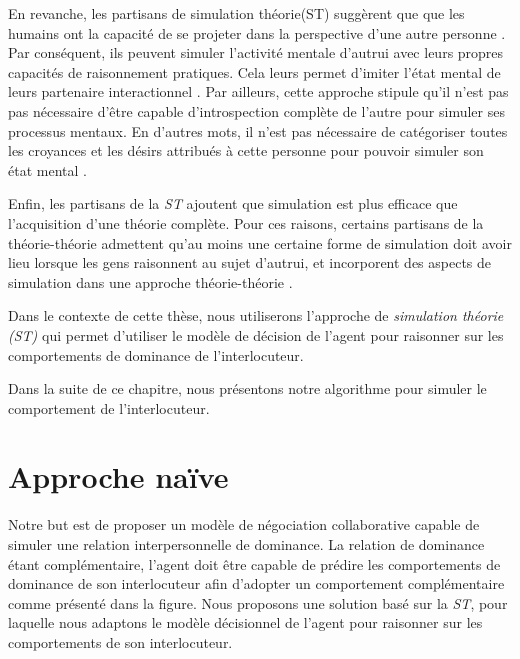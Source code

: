 En revanche, les partisans de simulation théorie(ST)  suggèrent que  que les humains ont la capacité de se projeter dans la perspective d'une autre personne \cite{shanton2010simulation}.
Par conséquent, ils peuvent simuler l'activité mentale d'autrui avec leurs propres capacités de raisonnement pratiques. Cela leurs permet d'imiter l'état mental de leurs partenaire interactionnel \cite{harbers2009modeling}.
Par ailleurs, cette approche stipule qu'il n'est pas pas nécessaire d'être capable d'introspection complète de l'autre pour simuler ses processus mentaux. En d'autres mots, il n'est pas nécessaire de catégoriser toutes les croyances et les désirs attribués à cette personne pour pouvoir simuler son état mental \cite{harbers2012modeling}.

Enfin, les partisans de la \emph{ST} ajoutent que simulation est plus efficace que l'acquisition d'une théorie complète. Pour ces raisons, certains partisans de la théorie-théorie admettent qu'au moins une certaine forme de simulation doit avoir lieu lorsque les gens raisonnent au sujet d'autrui, et incorporent des aspects de simulation dans une approche théorie-théorie \cite{harbers2012modeling}.

Dans le contexte de cette thèse, nous utiliserons l'approche de \emph{simulation théorie (ST)} qui permet d'utiliser le modèle de décision de l'agent pour raisonner sur les comportements de dominance de l'interlocuteur. 

Dans la suite de ce chapitre, nous présentons notre algorithme pour simuler le comportement de l'interlocuteur.


\section{Approche naïve}
	Notre but est de proposer un modèle de négociation collaborative capable de simuler une relation interpersonnelle de dominance. La relation de dominance étant complémentaire, l'agent doit être capable de prédire les comportements de dominance de son interlocuteur afin d'adopter un comportement complémentaire comme présenté dans la figure. Nous proposons une solution basé sur la \emph{ST}, pour laquelle nous adaptons le modèle décisionnel de l'agent pour raisonner sur les comportements de son interlocuteur. 
	
